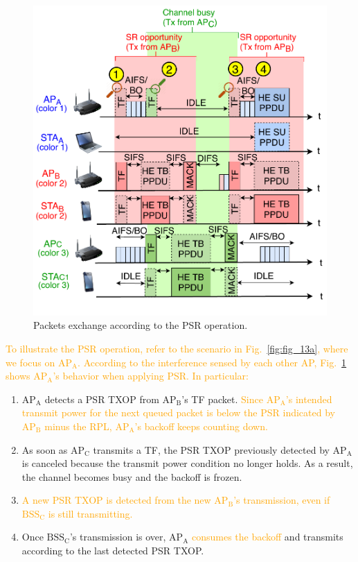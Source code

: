 \documentclass{ieeeaccess}
\begin{document}
\begin{figure}[ht!]
	\centering
	\includegraphics[width=.95\columnwidth]{fig_13b}
	\caption{Packets exchange according to the PSR operation.}
	\label{fig:fig_13b}
\end{figure}

\textcolor{orange}{To illustrate the PSR operation, refer to the scenario in Fig.~\ref{fig:fig_13a}, where we focus on $\text{AP}_\text{A}$. According to the interference sensed by each other AP, Fig.~\ref{fig:fig_13b} shows $\text{AP}_\text{A}$'s behavior when applying PSR. In particular:}
\begin{enumerate}
	\item $\text{AP}_\text{A}$ detects a PSR TXOP from $\text{AP}_\text{B}$'s TF packet. \textcolor{orange}{Since $\text{AP}_\text{A}$'s intended transmit power for the next queued packet is below the PSR indicated by $\text{AP}_\text{B}$ minus the RPL, $\text{AP}_\text{A}$'s backoff keeps counting down.}
	\item As soon as $\text{AP}_\text{C}$ transmits a TF, the PSR TXOP previously detected by $\text{AP}_\text{A}$ is canceled because the transmit power condition no longer holds. As a result, the channel becomes busy and the backoff is frozen.
	\item \textcolor{orange}{A new PSR TXOP is detected  from the new $\text{AP}_\text{B}$'s transmission, even if $\text{BSS}_\text{C}$ is still transmitting.}
	\item Once $\text{BSS}_\text{C}$'s transmission is over, $\text{AP}_\text{A}$ \textcolor{orange}{consumes the backoff} and transmits according to the last detected PSR TXOP.
\end{enumerate}
\end{document}
